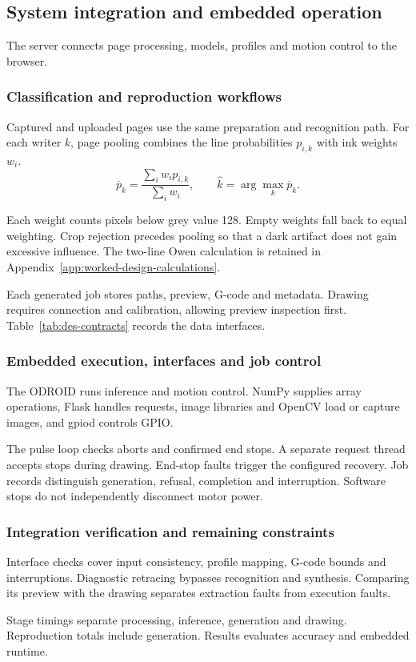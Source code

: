 \subsection{System integration and embedded operation}
\label{sec:des-integration}
The server connects page processing, models, profiles and motion control to the browser.

\subsubsection{Classification and reproduction workflows}
Captured and uploaded pages use the same preparation and recognition path. For each writer $k$, page pooling combines the line probabilities $p_{i,k}$ with ink weights $w_i$.
\begin{equation}
\overline p_k=\frac{\sum_i w_i p_{i,k}}{\sum_i w_i},\qquad
\widehat k=\arg\max_k\overline p_k.
\label{eq:des-pagevote}
\end{equation}

Each weight counts pixels below grey value 128. Empty weights fall back to equal weighting. Crop rejection precedes pooling so that a dark artifact does not gain excessive influence. The two-line Owen calculation is retained in Appendix~\ref{app:worked-design-calculations}.

Each generated job stores paths, preview, G-code and metadata. Drawing requires connection and calibration, allowing preview inspection first. Table~\ref{tab:des-contracts} records the data interfaces.

\subsubsection{Embedded execution, interfaces and job control}
The ODROID runs inference and motion control. NumPy supplies array operations, Flask handles requests, image libraries and OpenCV load or capture images, and gpiod controls GPIO.

The pulse loop checks aborts and confirmed end stops. A separate request thread accepts stops during drawing. End-stop faults trigger the configured recovery. Job records distinguish generation, refusal, completion and interruption. Software stops do not independently disconnect motor power.

\subsubsection{Integration verification and remaining constraints}
Interface checks cover input consistency, profile mapping, G-code bounds and interruptions. Diagnostic retracing bypasses recognition and synthesis. Comparing its preview with the drawing separates extraction faults from execution faults.

Stage timings separate processing, inference, generation and drawing. Reproduction totals include generation. Results evaluates accuracy and embedded runtime.
\FloatBarrier
